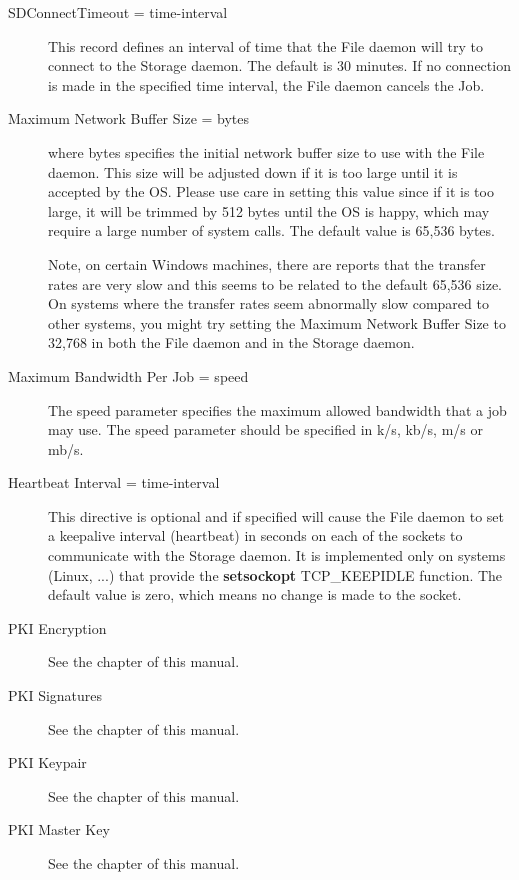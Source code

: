\begin{description}
\item [SDConnectTimeout = \lt{}time-interval\gt{}]
   This  record defines an interval of time that  the File daemon will try to
   connect to the  Storage daemon. The default is 30 minutes. If no connection 
   is made in the specified time interval, the File daemon  cancels the Job. 

\item [Maximum Network Buffer Size = \lt{}bytes\gt{}]  
   where \lt{}bytes\gt{} specifies the initial network buffer  size to use with
   the File daemon. This size will be adjusted down  if it is too large until it
   is accepted by the OS. Please use  care in setting this value since if it is
   too large, it will  be trimmed by 512 bytes until the OS is happy, which may
   require  a large number of system calls. The default value is 65,536 bytes. 

   Note, on certain Windows machines, there are reports that the
   transfer rates are very slow and this seems to be related to
   the default 65,536 size. On systems where the transfer rates
   seem abnormally slow compared to other systems, you might try
   setting the Maximum Network Buffer Size to 32,768 in both the
   File daemon and in the Storage daemon.

\item [Maximum Bandwidth Per Job = \lt{}speed\gt{}]

The speed parameter specifies the maximum allowed bandwidth that a job may
use. The speed parameter should be specified in k/s, kb/s, m/s or mb/s.

\item [Heartbeat Interval = \lt{}time-interval\gt{}]
   This directive is optional and if specified will cause the File daemon to
   set a keepalive interval (heartbeat) in seconds on each of the sockets
   to communicate with the Storage daemon.  It is implemented only on systems
   (Linux, ...) that provide the {\bf setsockopt} TCP\_KEEPIDLE function.
   The default value is zero, which means no change is made to the socket.


\item [PKI Encryption]
  See the  chapter of this manual. 

\item [PKI Signatures]
  See the  chapter of this manual. 

\item [PKI Keypair]
  See the  chapter of this manual. 

\item [PKI Master Key]
  See the  chapter of this manual. 

\end{description}

